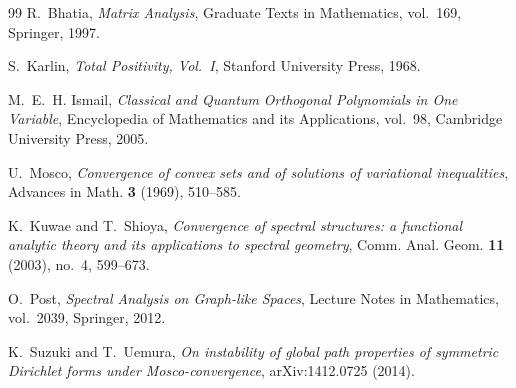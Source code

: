 \documentclass[11pt]{amsart}
\theoremstyle{definition}
\theoremstyle{remark}
\begin{document}
\begin{thebibliography}{99}
R.~Bhatia,
\emph{Matrix Analysis},
Graduate Texts in Mathematics, vol.~169, Springer, 1997.

S.~Karlin,
\emph{Total Positivity, Vol.~I},
Stanford University Press, 1968.

M.~E.~H. Ismail,
\emph{Classical and Quantum Orthogonal Polynomials in One Variable},
Encyclopedia of Mathematics and its Applications, vol.~98, Cambridge
University Press, 2005.

U.~Mosco,
\emph{Convergence of convex sets and of solutions of variational
inequalities},
Advances in Math. \textbf{3} (1969), 510--585.

K.~Kuwae and T.~Shioya,
\emph{Convergence of spectral structures: a functional analytic theory
and its applications to spectral geometry},
Comm. Anal. Geom. \textbf{11} (2003), no.~4, 599--673.

O.~Post,
\emph{Spectral Analysis on Graph-like Spaces},
Lecture Notes in Mathematics, vol.~2039, Springer, 2012.

K.~Suzuki and T.~Uemura,
\emph{On instability of global path properties of symmetric Dirichlet
forms under Mosco-convergence},
arXiv:1412.0725 (2014).

\end{thebibliography}
\end{document}
